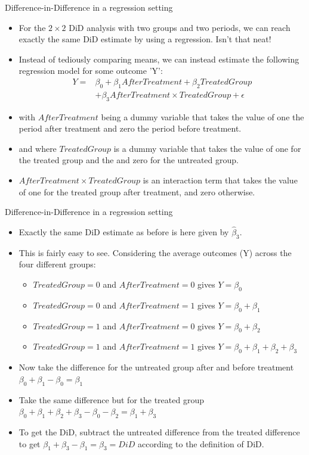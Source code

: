 \documentclass[notes,11pt, aspectratio=169]{beamer}
\begin{document}
\begin{frame}{Difference-in-Difference in a regression setting}
\begin{itemize}
\item For the $2\times2$ DiD analysis with two groups and two periods, we can reach exactly the same DiD estimate by using a regression. Isn't that neat!
\item Instead of tediously comparing means, we can instead estimate the following regression model for some outcome 'Y':
\begin{align}
Y = &\beta_0 + \beta_1 AfterTreatment + \beta_2 TreatedGroup\\ \nonumber
&+ \beta_3 AfterTreatment \times TreatedGroup + \epsilon
\end{align}
\item with  $AfterTreatment$ being a dummy variable that takes the value of one the period after treatment and zero the period before treatment.
\item and where $TreatedGroup$ is a dummy variable that takes the value of one for the treated group and the and zero for the untreated group. 
\item  $AfterTreatment \times TreatedGroup$ is an interaction term that takes the value of one for the treated group after treatment, and zero otherwise.
\end{itemize}
\end{frame}

\begin{frame}{Difference-in-Difference in a regression setting}
\begin{itemize}
\item Exactly the same DiD estimate as before is here given by $\hat{\beta}_3$.
\item This is fairly easy to see. Considering the average outcomes (Y) across the four different groups: 
    \begin{itemize}
    \item $TreatedGroup=0$ and $AfterTreatment=0$ gives $Y=\beta_0$ 
    \item $TreatedGroup=0$ and $AfterTreatment=1$ gives $Y=\beta_0 + \beta_1$ 
    \item $TreatedGroup=1$ and $AfterTreatment=0$ gives $Y=\beta_0 + \beta_2$ 
    \item $TreatedGroup=1$ and $AfterTreatment=1$ gives $Y=\beta_0+\beta_1+\beta_2+\beta_3$ 
    \end{itemize}
\item Now take the difference for the untreated group after and before treatment  $\beta_0 +\beta_1 -\beta_0 = \beta_1$
\item Take the same difference but for the treated group  $\beta_0 +\beta_1 +\beta_2 + \beta_3 - \beta_0 -\beta_2= \beta_1+\beta_3$
\item To get the DiD, subtract the untreated difference from the treated difference to get $\beta_1 + \beta_3 - \beta_1 = \beta_3 = DiD$ according to the definition of DiD.  
\end{itemize}
\end{frame}
\end{document}
